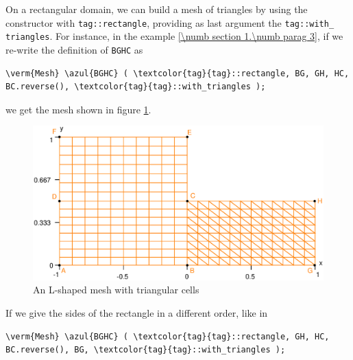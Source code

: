 On a rectangular domain, we can build a mesh of triangles by using the {\small\tt {}}
constructor with {\small\tt \textcolor{tag}{tag}::rectangle}, providing as last argument the
{\small\tt \textcolor{tag}{tag}::with\_\,triangles}.
For instance, in the example \ref{\numb section 1.\numb parag 3},
if we re-write the definition of {\small\tt BGHC} as

\begin{Verbatim}[commandchars=\\\{\},formatcom=\small\tt,baselinestretch=0.94]
   \verm{Mesh} \azul{BGHC} ( \textcolor{tag}{tag}::rectangle, BG, GH, HC, BC.reverse(), \textcolor{tag}{tag}::with_triangles );
\end{Verbatim}

\noindent we get the mesh shown in figure \ref{\numb section 2.\numb fig 3}.

\begin{figure}[ht] \centering
  \includegraphics[width=115mm]{L-shaped-tri}
  \caption{An L-shaped mesh with triangular cells}
  \label{\numb section 2.\numb fig 3}
\end{figure}

If we give the sides of the rectangle in a different order, like in

\begin{Verbatim}[commandchars=\\\{\},formatcom=\small\tt,baselinestretch=0.94]
   \verm{Mesh} \azul{BGHC} ( \textcolor{tag}{tag}::rectangle, GH, HC, BC.reverse(), BG, \textcolor{tag}{tag}::with_triangles );
\end{Verbatim}

